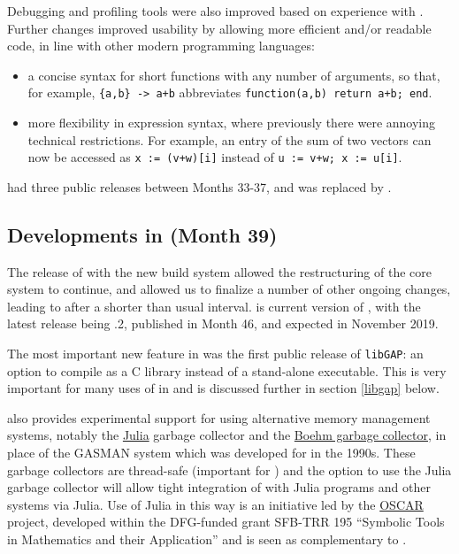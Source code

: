 Debugging  and profiling tools were also improved based on experience with
. Further changes improved \GAP
usability by allowing more efficient and/or readable code, in line
with other modern programming languages:
\begin{itemize}
  \item a concise syntax for short
    functions with any number of arguments, so that, for example,
    \verb|{a,b} -> a+b| abbreviates \verb|function(a,b) return a+b; end|. 
\item more flexibility in \GAP expression syntax,
  where previously there were annoying technical restrictions. For
  example, an entry of the sum of two vectors can now be accessed as
  \verb|x := (v+w)[i]| instead of \verb|u := v+w; x := u[i]|.
  

\end{itemize}

 had three public releases between Months 33-37, and
was replaced by .

\subsection{Developments in  (Month 39)}\label{gap-4.10}

The release of  with the new build system allowed the
restructuring of the core \GAP system to continue, and allowed us to
finalize a number of other ongoing changes, leading to 
after a shorter than usual interval.  is current
version of \GAP, with the latest release being .2, published
in Month 46, and  expected in November 2019.

The most important new feature in  was the first public
release of \texttt{libGAP}: an
option to compile \GAP as a C library instead of a stand-alone
executable. This is very important for many uses of \GAP in \ODK and
is discussed further in section \ref{libgap} below.

 also provides experimental support for using alternative
memory management systems, notably the \href{??}{Julia} garbage
collector and the \href{???}{Boehm garbage collector}, in place of the
GASMAN system which was developed for  in the 1990s.  These
garbage collectors are thread-safe (important for \HPCGAP) and the
option to use the Julia garbage collector will allow tight integration
of \GAP with Julia programs and other systems via Julia. Use of Julia
in this way is an initiative led by the
\href{https://oscar.computeralgebra.de/}{OSCAR} project, developed
within the DFG-funded grant SFB-TRR 195 ``Symbolic Tools in
Mathematics and their Application'' and is seen as complementary to \ODK.

